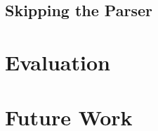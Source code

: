 \documentclass[
	msc,
	english
]{ppgccufmg}
\begin{document}
	  \section{Skipping the Parser}
	\chapter{Evaluation}
	\chapter{Future Work}





\end{document}
